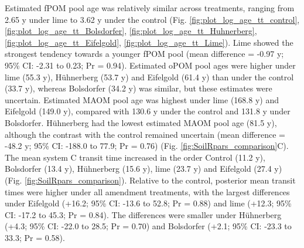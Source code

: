 \documentclass[preprint,12pt]{elsarticle}
\begin{document}
  Estimated fPOM pool age was relatively similar across treatments, ranging from 2.65 y under lime to 3.62 y under the control (Fig. \ref{fig:plot_log_age_tt_control}, \ref{fig:plot_log_age_tt_Bolsdorfer}, \ref{fig:plot_log_age_tt_Huhnerberg}, \ref{fig:plot_log_age_tt_Eifelgold}, \ref{fig:plot_log_age_tt_Lime}). Lime showed the strongest tendency towards a younger fPOM pool (mean difference = -0.97 y; 95\% CI: -2.31 to 0.23; Pr = 0.94). Estimated oPOM pool ages were higher under lime (55.3 y), Hühnerberg (53.7 y) and Eifelgold (61.4 y) than under the control (33.7 y), whereas Bolsdorfer (34.2 y) was similar, but these estimates were  uncertain. Estimated MAOM pool age was highest under lime (168.8 y) and Eifelgold (149.0 y), compared with 130.6 y under the control and 131.8 y under Bolsdorfer. Hühnerberg had the lowest estimated MAOM pool age (81.5 y), although the contrast with the control remained uncertain (mean difference = -48.2 y; 95\% CI: -188.0 to 77.9; Pr = 0.76) (Fig. \ref{fig:SoilRpars_comparison}C).
  The mean system C transit time increased in the order Control (11.2 y), Bolsdorfer (13.4 y), Hühnerberg (15.6 y), lime (23.7 y) and Eifelgold (27.4 y) (Fig. \ref{fig:SoilRpars_comparison}). Relative to the control, posterior mean transit times were higher under all amendment treatments, with the largest differences under Eifelgold (+16.2; 95\% CI: -13.6 to 52.8; Pr = 0.88) and lime (+12.3; 95\% CI: -17.2 to 45.3; Pr = 0.84). The differences were smaller under Hühnerberg (+4.3; 95\% CI: -22.0 to 28.5; Pr = 0.70) and Bolsdorfer (+2.1; 95\% CI: -23.3 to 33.3; Pr = 0.58).
\end{document}
